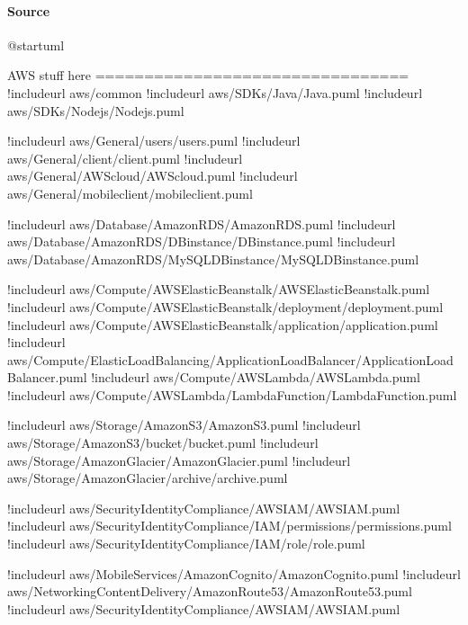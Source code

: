 \documentclass[letterpaper,10pt,english]{sphinxmanual}
\begin{document}
\paragraph{Source}
\label{\detokenize{C4/c4acme:id4}}
\begin{sphinxVerbatim}[commandchars=\\\{\},numbers=left,firstnumber=1,stepnumber=1]
@startuml

\PYGZsq{}AWS stuff here
\PYGZsq{}================================
!includeurl \PYGZlt{}aws/common\PYGZgt{}
!includeurl \PYGZlt{}aws/SDKs/Java/Java.puml\PYGZgt{}
!includeurl \PYGZlt{}aws/SDKs/Nodejs/Nodejs.puml\PYGZgt{}

!includeurl \PYGZlt{}aws/General/users/users.puml\PYGZgt{}
!includeurl \PYGZlt{}aws/General/client/client.puml\PYGZgt{}
!includeurl \PYGZlt{}aws/General/AWScloud/AWScloud.puml\PYGZgt{}
!includeurl \PYGZlt{}aws/General/mobileclient/mobileclient.puml\PYGZgt{}

!includeurl \PYGZlt{}aws/Database/AmazonRDS/AmazonRDS.puml\PYGZgt{}
!includeurl \PYGZlt{}aws/Database/AmazonRDS/DBinstance/DBinstance.puml\PYGZgt{}
!includeurl \PYGZlt{}aws/Database/AmazonRDS/MySQLDBinstance/MySQLDBinstance.puml\PYGZgt{}

!includeurl \PYGZlt{}aws/Compute/AWSElasticBeanstalk/AWSElasticBeanstalk.puml\PYGZgt{}
!includeurl \PYGZlt{}aws/Compute/AWSElasticBeanstalk/deployment/deployment.puml\PYGZgt{}
!includeurl \PYGZlt{}aws/Compute/AWSElasticBeanstalk/application/application.puml\PYGZgt{}
!includeurl \PYGZlt{}aws/Compute/ElasticLoadBalancing/ApplicationLoadBalancer/ApplicationLoadBalancer.puml\PYGZgt{}
!includeurl \PYGZlt{}aws/Compute/AWSLambda/AWSLambda.puml\PYGZgt{}
!includeurl \PYGZlt{}aws/Compute/AWSLambda/LambdaFunction/LambdaFunction.puml\PYGZgt{}

!includeurl \PYGZlt{}aws/Storage/AmazonS3/AmazonS3.puml\PYGZgt{}
!includeurl \PYGZlt{}aws/Storage/AmazonS3/bucket/bucket.puml\PYGZgt{}
!includeurl \PYGZlt{}aws/Storage/AmazonGlacier/AmazonGlacier.puml\PYGZgt{}
!includeurl \PYGZlt{}aws/Storage/AmazonGlacier/archive/archive.puml\PYGZgt{}

!includeurl \PYGZlt{}aws/SecurityIdentityCompliance/AWSIAM/AWSIAM.puml\PYGZgt{}
!includeurl \PYGZlt{}aws/SecurityIdentityCompliance/IAM/permissions/permissions.puml\PYGZgt{}
!includeurl \PYGZlt{}aws/SecurityIdentityCompliance/IAM/role/role.puml\PYGZgt{}

!includeurl \PYGZlt{}aws/MobileServices/AmazonCognito/AmazonCognito.puml\PYGZgt{}
!includeurl \PYGZlt{}aws/NetworkingContentDelivery/AmazonRoute53/AmazonRoute53.puml\PYGZgt{}
!includeurl \PYGZlt{}aws/SecurityIdentityCompliance/AWSIAM/AWSIAM.puml\PYGZgt{}


\end{sphinxVerbatim}
\end{document}
